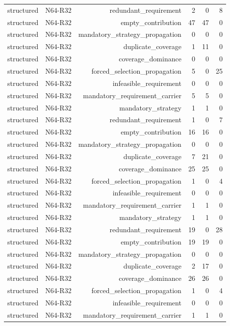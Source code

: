 {\begin{longtable}{lrrrrr}
structured & N64-R32 & redundant\_requirement & 2 & 0 & 8 \\
structured & N64-R32 & empty\_contribution & 47 & 47 & 0 \\
structured & N64-R32 & mandatory\_strategy\_propagation & 0 & 0 & 0 \\
structured & N64-R32 & duplicate\_coverage & 1 & 11 & 0 \\
structured & N64-R32 & coverage\_dominance & 0 & 0 & 0 \\
structured & N64-R32 & forced\_selection\_propagation & 5 & 0 & 25 \\
structured & N64-R32 & infeasible\_requirement & 0 & 0 & 0 \\
structured & N64-R32 & mandatory\_requirement\_carrier & 5 & 5 & 0 \\
structured & N64-R32 & mandatory\_strategy & 1 & 1 & 0 \\
structured & N64-R32 & redundant\_requirement & 1 & 0 & 7 \\
structured & N64-R32 & empty\_contribution & 16 & 16 & 0 \\
structured & N64-R32 & mandatory\_strategy\_propagation & 0 & 0 & 0 \\
structured & N64-R32 & duplicate\_coverage & 7 & 21 & 0 \\
structured & N64-R32 & coverage\_dominance & 25 & 25 & 0 \\
structured & N64-R32 & forced\_selection\_propagation & 1 & 0 & 4 \\
structured & N64-R32 & infeasible\_requirement & 0 & 0 & 0 \\
structured & N64-R32 & mandatory\_requirement\_carrier & 1 & 1 & 0 \\
structured & N64-R32 & mandatory\_strategy & 1 & 1 & 0 \\
structured & N64-R32 & redundant\_requirement & 19 & 0 & 28 \\
structured & N64-R32 & empty\_contribution & 19 & 19 & 0 \\
structured & N64-R32 & mandatory\_strategy\_propagation & 0 & 0 & 0 \\
structured & N64-R32 & duplicate\_coverage & 2 & 17 & 0 \\
structured & N64-R32 & coverage\_dominance & 26 & 26 & 0 \\
structured & N64-R32 & forced\_selection\_propagation & 1 & 0 & 4 \\
structured & N64-R32 & infeasible\_requirement & 0 & 0 & 0 \\
structured & N64-R32 & mandatory\_requirement\_carrier & 1 & 1 & 0 \\

\end{longtable}}
